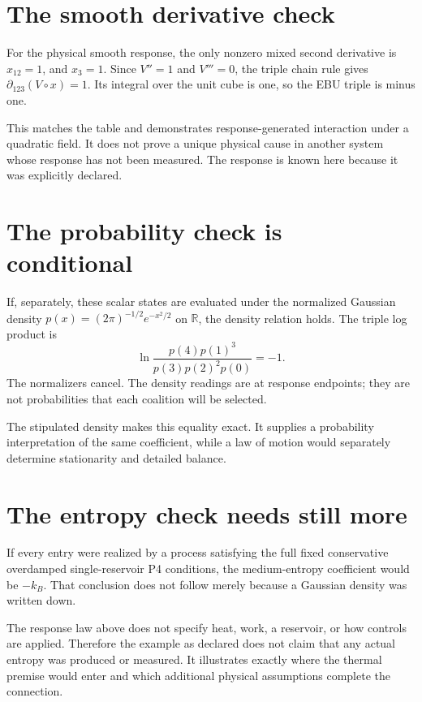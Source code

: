 \section{The smooth derivative check}
For the physical smooth response, the only nonzero mixed second derivative is $x_{12}=1$, and $x_3=1$. Since $V''=1$ and $V'''=0$, the triple chain rule gives $\partial_{123}(V\circ x)=1$. Its integral over the unit cube is one, so the EBU triple is minus one.

This matches the table and demonstrates response-generated interaction under a quadratic field. It does not prove a unique physical cause in another system whose response has not been measured. The response is known here because it was explicitly declared.

\section{The probability check is conditional}
If, separately, these scalar states are evaluated under the normalized Gaussian density $p(x)=(2\pi)^{-1/2}e^{-x^2/2}$ on $\mathbb R$, the density relation holds. The triple log product is
\begin{equation}
 \ln\frac{p(4)p(1)^3}{p(3)p(2)^2p(0)}=-1.
\end{equation}
The normalizers cancel. The density readings are at response endpoints; they are not probabilities that each coalition will be selected.

The stipulated density makes this equality exact. It supplies a probability interpretation of the same coefficient, while a law of motion would separately determine stationarity and detailed balance.

\section{The entropy check needs still more}
If every entry were realized by a process satisfying the full fixed conservative overdamped single-reservoir P4 conditions, the medium-entropy coefficient would be $-k_B$. That conclusion does not follow merely because a Gaussian density was written down.

The response law above does not specify heat, work, a reservoir, or how controls are applied. Therefore the example as declared does not claim that any actual entropy was produced or measured. It illustrates exactly where the thermal premise would enter and which additional physical assumptions complete the connection.

